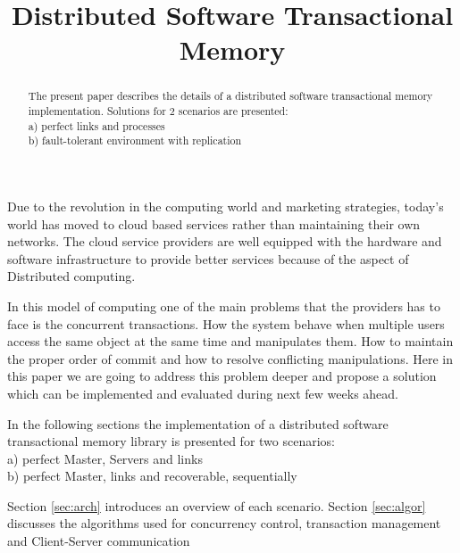 \documentclass[times, 10pt,twocolumn]{article}
\begin{document}
\title{Distributed Software Transactional Memory}

\maketitle
\thispagestyle{empty}

\begin{abstract}
   The present paper describes the details of a distributed software
   transactional memory implementation.
   Solutions for 2 scenarios are presented: \\
   a) perfect links and processes \\
   b) fault-tolerant environment with replication \\
\end{abstract}

Due to the revolution in the computing world and marketing strategies, today’s world has moved to cloud based services rather than maintaining their own networks. The cloud service providers are well
equipped with the hardware and software infrastructure to provide better services because of the aspect of Distributed computing. 

In this model of computing one of the main problems that the providers has to face is the concurrent transactions. How the system behave when multiple users access the same object at the same 
time and manipulates them. How to maintain the proper order of commit and how to resolve conflicting manipulations. Here in this paper we are going to address this problem deeper and propose 
a solution which can be implemented and evaluated during next few weeks ahead.

In the following sections the implementation of a distributed software transactional memory library is presented for two scenarios: \\
a) perfect Master, Servers and links \\
b) perfect Master, links and recoverable, sequentially 

Section \ref{sec:arch} introduces an overview of each scenario. Section 
\ref{sec:algor} discusses the algorithms used for concurrency control, 
transaction management and Client-Server communication


\label{sec:arch}
\end{document}
